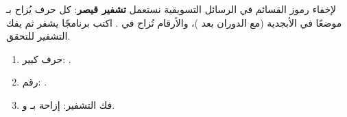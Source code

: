 \begin{statement}
لإخفاء رموز القسائم في الرسائل التسويقية نستعمل \textbf{تشفير قيصر}: كل حرف يُزاح بـ  موضعًا في الأبجدية (مع الدوران بعد )، والأرقام تُزاح في . اكتب برنامجًا يشفر ثم يفك التشفير للتحقق.
\end{statement}
\begin{stepsbox}\begin{enumerate}
\item حرف كبير: .
\item رقم: .
\item فك التشفير: إزاحة بـ  و.
\end{enumerate}\end{stepsbox}
